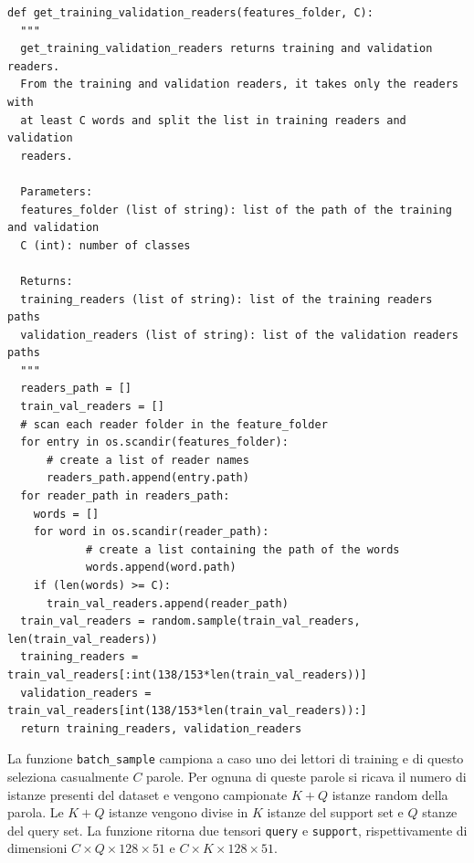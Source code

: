 \documentclass[12pt,a4paper,titlepage]{article}
\begin{document}
\begin{lstlisting}[language=iPython,firstnumber=1, caption=get\_training\_validation\_readers, label=get_training_validation_readers,captionpos=b]
def get_training_validation_readers(features_folder, C):
  """
  get_training_validation_readers returns training and validation readers. 
  From the training and validation readers, it takes only the readers with 
  at least C words and split the list in training readers and validation 
  readers.

  Parameters:
  features_folder (list of string): list of the path of the training and validation
  C (int): number of classes

  Returns:
  training_readers (list of string): list of the training readers paths
  validation_readers (list of string): list of the validation readers paths
  """
  readers_path = []
  train_val_readers = []
  # scan each reader folder in the feature_folder
  for entry in os.scandir(features_folder):
      # create a list of reader names
      readers_path.append(entry.path)
  for reader_path in readers_path:
    words = []
    for word in os.scandir(reader_path):
            # create a list containing the path of the words
            words.append(word.path)
    if (len(words) >= C):
      train_val_readers.append(reader_path)
  train_val_readers = random.sample(train_val_readers, len(train_val_readers))
  training_readers = train_val_readers[:int(138/153*len(train_val_readers))]
  validation_readers = train_val_readers[int(138/153*len(train_val_readers)):]
  return training_readers, validation_readers
\end{lstlisting}

La funzione \texttt{batch\_sample} campiona a caso uno dei lettori di training e di questo seleziona casualmente $C$ parole. Per ognuna di queste parole si ricava il numero di istanze presenti del dataset e vengono campionate $K+Q$ istanze random della parola. Le $K+Q$ istanze vengono divise in $K$ istanze del support set e $Q$ stanze del query set. La funzione ritorna due tensori \texttt{query} e \texttt{support}, rispettivamente di dimensioni $C \times Q \times 128 \times 51$ e $C \times K \times 128 \times 51$.
\end{document}
